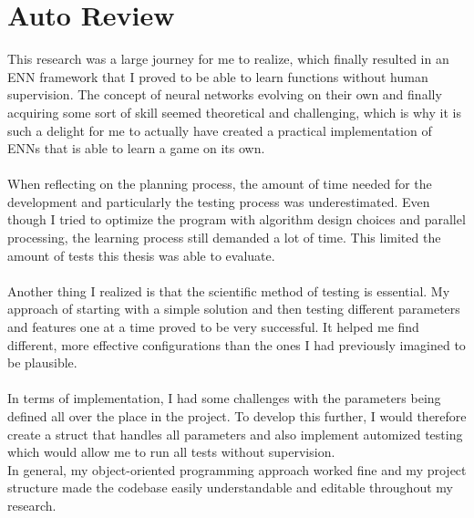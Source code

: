 \section{Auto Review}\label{sec:auto-review}
This research was a large journey for me to realize, which finally resulted in an ENN framework that I proved to be able to learn functions without human supervision.
The concept of neural networks evolving on their own and finally acquiring some sort of skill seemed theoretical and challenging, which is why it is such a delight for me to actually have created a practical implementation of ENNs that is able to learn a game on its own.
\\ \\
When reflecting on the planning process, the amount of time needed for the development and particularly the testing process was underestimated.
Even though I tried to optimize the program with algorithm design choices and parallel processing, the learning process still demanded a lot of time.
This limited the amount of tests this thesis was able to evaluate.
\\ \\
Another thing I realized is that the scientific method of testing is essential.
My approach of starting with a simple solution and then testing different parameters and features one at a time proved to be very successful.
It helped me find different, more effective configurations than the ones I had previously imagined to be plausible.
\\ \\
In terms of implementation, I had some challenges with the parameters being defined all over the place in the project.
To develop this further, I would therefore create a struct that handles all parameters and also implement automized testing which would allow me to run all tests without supervision.
\\
In general, my object-oriented programming approach worked fine and my project structure made the codebase easily understandable and editable throughout my research.


